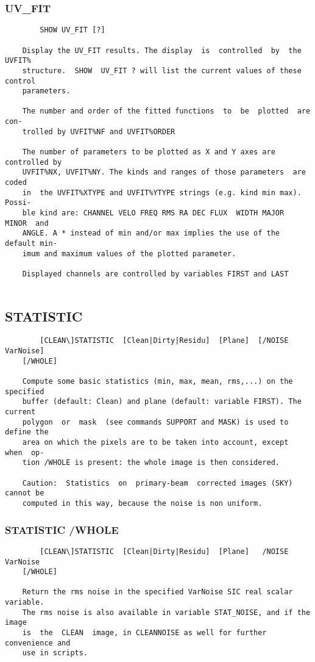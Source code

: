 \subsubsection{UV\_FIT}
\begin{verbatim}
        SHOW UV_FIT [?]

    Display the UV_FIT results. The display  is  controlled  by  the  UVFIT%
    structure.  SHOW  UV_FIT ? will list the current values of these control
    parameters.

    The number and order of the fitted functions  to  be  plotted  are  con-
    trolled by UVFIT%NF and UVFIT%ORDER

    The number of parameters to be plotted as X and Y axes are controlled by
    UVFIT%NX, UVFIT%NY. The kinds and ranges of those parameters  are  coded
    in  the UVFIT%XTYPE and UVFIT%YTYPE strings (e.g. kind min max).  Possi-
    ble kind are: CHANNEL VELO FREQ RMS RA DEC FLUX  WIDTH MAJOR  MINOR  and
    ANGLE. A * instead of min and/or max implies the use of the default min-
    imum and maximum values of the plotted parameter.

    Displayed channels are controlled by variables FIRST and LAST


\end{verbatim}
\subsection{STATISTIC}
\begin{verbatim}
        [CLEAN\]STATISTIC  [Clean|Dirty|Residu]  [Plane]  [/NOISE  VarNoise]
    [/WHOLE]

    Compute some basic statistics (min, max, mean, rms,...) on the specified
    buffer (default: Clean) and plane (default: variable FIRST). The current
    polygon  or  mask  (see commands SUPPORT and MASK) is used to define the
    area on which the pixels are to be taken into account, except  when  op-
    tion /WHOLE is present: the whole image is then considered.

    Caution:  Statistics  on  primary-beam  corrected images (SKY) cannot be
    computed in this way, because the noise is non uniform.

\end{verbatim}
\subsubsection{STATISTIC /WHOLE}
\begin{verbatim}
        [CLEAN\]STATISTIC  [Clean|Dirty|Residu]  [Plane]   /NOISE   VarNoise
    [/WHOLE]

    Return the rms noise in the specified VarNoise SIC real scalar variable.
    The rms noise is also available in variable STAT_NOISE, and if the image
    is  the  CLEAN  image, in CLEANNOISE as well for further convenience and
    use in scripts.

\end{verbatim}
